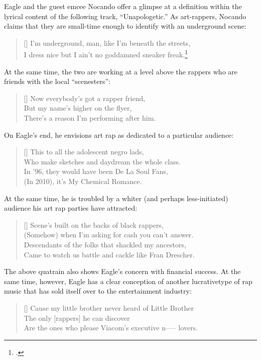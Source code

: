 Eagle and the guest emcee Nocando offer a glimpse at a definition within the lyrical content of the following
track, ``Unapologetic.'' As art-rappers, Nocando claims that they are small-time enough to identify with 
an underground scene:
\settowidth{\versewidth}{I dress nice but I ain't no goddamned sneaker freak.}
    \begin{verse}[\versewidth]
        I'm underground, man, like I'm beneath the streets, \\ 
        I dress nice but I ain't no goddamned sneaker freak.\footnote{
            \cite{openmikeeagle2010}.}
    \end{verse}
At the same time, the two are working at a level above the rappers who are friends with the local 
``scenesters'':
\settowidth{\versewidth}{There's a reason I'm performing after him.}
    \begin{verse}[\versewidth]
        Now everybody's got a rapper friend, \\ 
        But my name's higher on the flyer,\\
        There's a reason I'm performing after him.
    \end{verse}
On Eagle's end, he envisions art rap as dedicated to a particular audience:
\settowidth{\versewidth}{Who make sketches and daydream the whole class.}
    \begin{verse}[\versewidth]
        This to all the adolescent negro lads, \\
        Who make sketches and daydream the whole class. \\
        In '96, they would have been De La Soul Fans, \\
        (In 2010), it's My Chemical Romance.
    \end{verse}
At the same time, he is troubled by a whiter (and perhaps less-initiated) audience his art rap 
parties have attracted:
\settowidth{\versewidth}{Came to watch us battle and cackle like Fran Drescher.}
    \begin{verse}[\versewidth]
        Scene's built on the backs of black rappers, \\
        (Somehow) when I'm asking for cash you can't answer. \\ 
        Descendants of the folks that shackled my ancestors, \\ 
        Came to watch us battle and cackle like Fran Drescher.
    \end{verse}
The above quatrain also shows Eagle's concern with financial success. At the same time, however, Eagle has a
clear conception of another lucrativetype of rap music that has sold itself over to the entertainment 
industry:
\settowidth{\versewidth}{Cause my little brother never heard of Little Brother \textellipsis}
    \begin{verse}[\versewidth]
        Cause my little brother never heard of Little Brother \textellipsis \\ 
        The only [rappers] he can discover \\
        Are the ones who please Viacom's executive n----- lovers.
    \end{verse}

